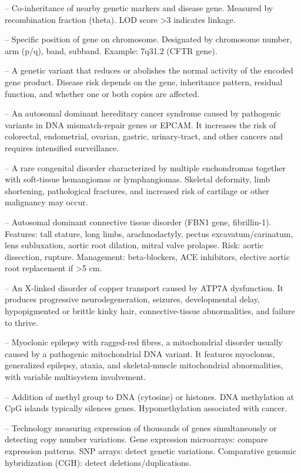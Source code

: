-- Co-inheritance of nearby genetic markers and disease gene. Measured by recombination fraction (theta). LOD score >3 indicates linkage.

-- Specific position of gene on chromosome. Designated by chromosome number, arm (p/q), band, subband. Example: 7q31.2 (CFTR gene).

-- A genetic variant that reduces or abolishes the normal activity of the encoded gene product. Disease risk depends on the gene, inheritance pattern, residual function, and whether one or both copies are affected.

-- An autosomal dominant hereditary cancer syndrome caused by pathogenic variants in DNA mismatch-repair genes or EPCAM. It increases the risk of colorectal, endometrial, ovarian, gastric, urinary-tract, and other cancers and requires intensified surveillance.

-- A rare congenital disorder characterized by multiple enchondromas together with soft-tissue hemangiomas or lymphangiomas. Skeletal deformity, limb shortening, pathological fractures, and increased risk of cartilage or other malignancy may occur.

-- Autosomal dominant connective tissue disorder (FBN1 gene, fibrillin-1). Features: tall stature, long limbs, arachnodactyly, pectus excavatum/carinatum, lens subluxation, aortic root dilation, mitral valve prolapse. Risk: aortic dissection, rupture. Management: beta-blockers, ACE inhibitors, elective aortic root replacement if >5 cm.

-- An X-linked disorder of copper transport caused by ATP7A dysfunction. It produces progressive neurodegeneration, seizures, developmental delay, hypopigmented or brittle kinky hair, connective-tissue abnormalities, and failure to thrive.

-- Myoclonic epilepsy with ragged-red fibres, a mitochondrial disorder usually caused by a pathogenic mitochondrial DNA variant. It features myoclonus, generalized epilepsy, ataxia, and skeletal-muscle mitochondrial abnormalities, with variable multisystem involvement.

-- Addition of methyl group to DNA (cytosine) or histones. DNA methylation at CpG islands typically silences genes. Hypomethylation associated with cancer.

-- Technology measuring expression of thousands of genes simultaneously or detecting copy number variations. Gene expression microarrays: compare expression patterns. SNP arrays: detect genetic variations. Comparative genomic hybridization (CGH): detect deletions/duplications.

